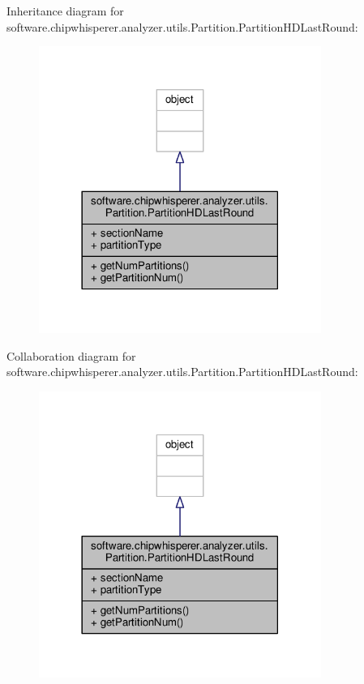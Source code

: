 Inheritance diagram for software.\+chipwhisperer.\+analyzer.\+utils.\+Partition.\+Partition\+H\+D\+Last\+Round\+:\nopagebreak
\begin{figure}[H]
\begin{center}
\leavevmode
\includegraphics[width=261pt]{d0/d3f/classsoftware_1_1chipwhisperer_1_1analyzer_1_1utils_1_1Partition_1_1PartitionHDLastRound__inherit__graph}
\end{center}
\end{figure}


Collaboration diagram for software.\+chipwhisperer.\+analyzer.\+utils.\+Partition.\+Partition\+H\+D\+Last\+Round\+:\nopagebreak
\begin{figure}[H]
\begin{center}
\leavevmode
\includegraphics[width=261pt]{d4/d7a/classsoftware_1_1chipwhisperer_1_1analyzer_1_1utils_1_1Partition_1_1PartitionHDLastRound__coll__graph}
\end{center}
\end{figure}


